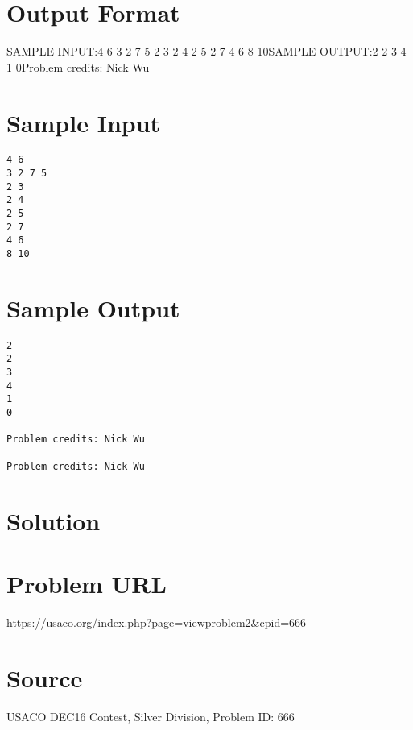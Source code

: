 \documentclass[12pt]{article}
\begin{document}
\section*{Output Format}
SAMPLE INPUT:4 6
3 2 7 5
2 3
2 4
2 5
2 7
4 6
8 10SAMPLE OUTPUT:2
2
3
4
1
0Problem credits: Nick Wu

\section*{Sample Input}
\begin{verbatim}
4 6
3 2 7 5
2 3
2 4
2 5
2 7
4 6
8 10
\end{verbatim}

\section*{Sample Output}
\begin{verbatim}
2
2
3
4
1
0

Problem credits: Nick Wu

Problem credits: Nick Wu
\end{verbatim}

\section*{Solution}


\section*{Problem URL}
https://usaco.org/index.php?page=viewproblem2&cpid=666

\section*{Source}
USACO DEC16 Contest, Silver Division, Problem ID: 666
\end{document}
